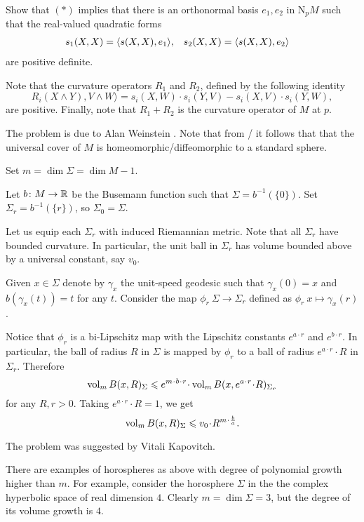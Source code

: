 Show that $({*})$ implies that there is an orthonormal basis $e_1,e_2$ in $\mathrm{N}_pM$ 
such that the real-valued quadratic forms 
\begin{align*}
s_1(X,X)&=\langle s(X,X),e_1\rangle,
&
s_2(X,X)&=\langle s(X,X),e_2\rangle
\end{align*}
are positive definite.

Note that the curvature operators $R_1$ and $R_2$, 
defined by the following identity
\[R_{i}(X\wedge Y), V\wedge W\rangle 
=s_i(X,W)\cdot s_i(Y,V)-s_i(X,V)\cdot s_i(Y,W),\]
 are positive.
Finally, note that $R_{1}+R_{2}$ is the curvature operator of $M$ at $p$.\qeds

The problem is due to Alan Weinstein \cite[see][]{weinstein}.
Note that from \cite{micallef-moore}/\cite{boehm-wilking} it follows that
that the universal cover of $M$ is homeomorphic/diffeomorphic to a standard sphere.



Set 
$m=\dim \Sigma=\dim M-1$.

Let $b\colon M\to\mathbb{R}$ be the Busemann function such that $\Sigma=b^{-1}(\{0\})$.
Set  $\Sigma_r=b^{-1}(\{r\})$, so $\Sigma_0=\Sigma$.

Let us equip each $\Sigma_r$ with induced Riemannian metric.
Note that all $\Sigma_r$ have bounded curvature.
In particular, the unit ball in $\Sigma_r$ has volume bounded above by a universal constant, say $v_0$.
 

Given $x\in \Sigma$ denote by $\gamma_x$ 
the unit-speed geodesic
such that $\gamma_x(0)=x$ and $b(\gamma_x(t))=t$ for any $t$.
Consider the map $\phi_{r}\:\Sigma\to\Sigma_r$ defined as
$\phi_r\:x\mapsto \gamma_x(r)$.

Notice that $\phi_r$ is a bi-Lipschitz map with the Lipschitz constants $e^{a\cdot r}$ and $e^{b\cdot r}$.
In particular, the ball of radius $R$ in $\Sigma$ is mapped by $\phi_r$
to a ball of radius $e^{a\cdot r}\cdot R$ in $\Sigma_r$.
Therefore
\[\vol_m B(x,R)_\Sigma\le e^{m\cdot b\cdot r}\cdot \vol_m B(x,e^{a\cdot r}\cdot R)_{\Sigma_r}\]
for any $R,r>0$.
Taking $e^{a\cdot r}\cdot R=1$, we get
\[\vol_m B(x,R)_\Sigma\le v_0\cdot R^{m\cdot \frac ba}.\]
\qedsf

The problem was suggested by Vitali Kapovitch.

There are examples of horospheres as above with degree of polynomial growth higher than $m$.
For example, consider the horosphere $\Sigma$ in the
the complex hyperbolic space 
of real dimension $4$.
Clearly $m=\dim \Sigma=3$, but the degree of its volume growth is $4$.


